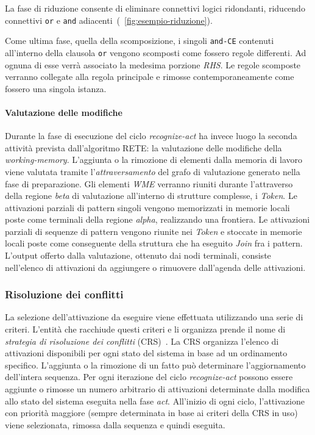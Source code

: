 La fase di riduzione consente di eliminare connettivi logici ridondanti, riducendo connettivi \texttt{or} e \texttt{and} adiacenti~(\figurename~\ref{fig:esempio-riduzione}).

Come ultima fase, quella della scomposizione, i singoli \texttt{and-CE} contenuti all'interno della clausola \texttt{or} vengono scomposti come fossero regole differenti. Ad ognuna di esse verrà associato la medesima porzione \emph{RHS}. Le regole scomposte verranno collegate alla regola principale e rimosse contemporaneamente come fossero una singola istanza.


\paragraph{Valutazione delle modifiche}

Durante la fase di esecuzione del ciclo \emph{recognize-act} ha invece luogo la seconda attività prevista dall'algoritmo RETE: la valutazione delle modifiche della \emph{working-memory}. L'aggiunta o la rimozione di elementi dalla memoria di lavoro viene valutata tramite l'\emph{attraversamento} del grafo di valutazione generato nella fase di preparazione. Gli elementi \emph{WME} verranno riuniti durante l'attraverso della regione \emph{beta} di valutazione all'interno di strutture complesse, i \emph{Token}.
Le attivazioni parziali di pattern singoli vengono memorizzati in memorie locali poste come terminali della regione \emph{alpha}, realizzando una frontiera.
Le attivazioni parziali di sequenze di pattern vengono riunite nei \emph{Token} e stoccate in memorie locali poste come conseguente della struttura che ha eseguito \emph{Join} fra i pattern.
L'output offerto dalla valutazione, ottenuto dai nodi terminali, consiste nell'elenco di attivazioni da aggiungere o rimuovere dall'agenda delle attivazioni.

\subsubsection{Risoluzione dei conflitti}\label{par:strategie-crs}

La selezione dell'attivazione da eseguire viene effettuata utilizzando una serie di criteri. L'entità che racchiude questi criteri e li organizza prende il nome di \emph{strategia di risoluzione dei conflitti} (CRS)~\cite{McDermott:1977:PSC:1045343.1045364}. La CRS organizza l'elenco di attivazioni disponibili per ogni stato del sistema in base ad un ordinamento specifico. L'aggiunta o la rimozione di un fatto può determinare l'aggiornamento dell'intera sequenza. Per ogni iterazione del ciclo \emph{recognize-act} possono essere aggiunte o rimosse un numero arbitrario di attivazioni determinate dalla modifica allo stato del sistema eseguita nella fase \emph{act}. All'inizio di ogni ciclo, l'attivazione con priorità maggiore (sempre determinata in base ai criteri della CRS in uso) viene selezionata, rimossa dalla sequenza e quindi eseguita.

